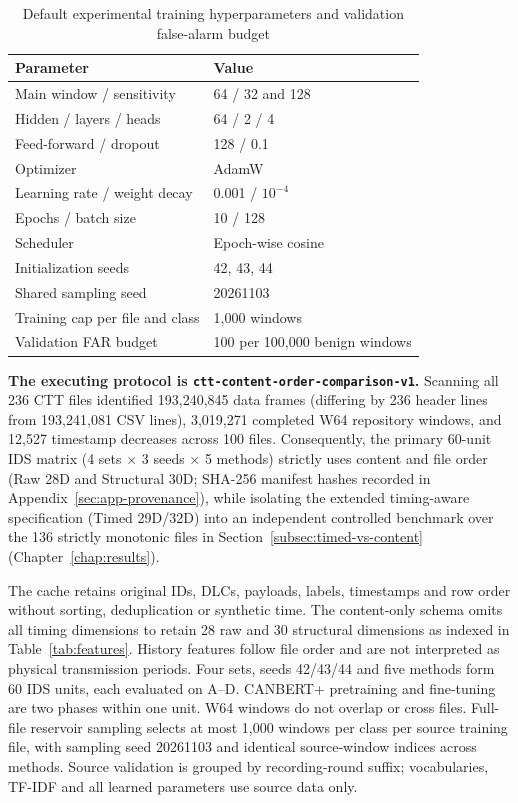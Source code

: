 \documentclass[12pt, a4paper, reqno, oneside]{book}
\DeclareRobustCommand{\code}[1]{\nolinkurl{#1}}
\begin{document}
{\renewcommand{\arraystretch}{0.88}
\begin{table}[htbp]\centering\footnotesize
\caption{Default experimental training hyperparameters and validation false-alarm budget}\label{tab:config}
\begin{tabular}{ll}\toprule Parameter & Value\\\midrule
Main window / sensitivity & 64 / 32 and 128\\
Hidden / layers / heads & 64 / 2 / 4\\
Feed-forward / dropout & 128 / 0.1\\
Optimizer & AdamW\\
Learning rate / weight decay & 0.001 / $10^{-4}$\\
Epochs / batch size & 10 / 128\\
Scheduler & Epoch-wise cosine\\
Initialization seeds & 42, 43, 44\\
Shared sampling seed & 20261103\\
Training cap per file and class & 1,000 windows\\
Validation FAR budget & 100 per 100,000 benign windows\\\bottomrule\end{tabular}
\end{table}}

\textbf{The executing protocol is \code{ctt-content-order-comparison-v1}.}
Scanning all 236 CTT files identified 193,240,845 data frames (differing by 236 header lines from 193,241,081 CSV lines), 3,019,271 completed W64 repository windows, and 12,527 timestamp decreases across 100 files. Consequently, the primary 60-unit IDS matrix (4 sets $\times$ 3 seeds $\times$ 5 methods) strictly uses content and file order (Raw 28D and Structural 30D; SHA-256 manifest hashes recorded in Appendix~\ref{sec:app-provenance}), while isolating the extended timing-aware specification (Timed 29D/32D) into an independent controlled benchmark over the 136 strictly monotonic files in Section~\ref{subsec:timed-vs-content} (Chapter~\ref{chap:results}).

The cache retains original IDs, DLCs, payloads, labels, timestamps and row order without sorting, deduplication or synthetic time. The content-only schema omits all timing dimensions to retain 28 raw and 30 structural dimensions as indexed in Table~\ref{tab:features}. History features follow file order and are not interpreted as physical transmission periods. Four sets, seeds 42/43/44 and five methods form 60 IDS units, each evaluated on A--D. CANBERT+ pretraining and fine-tuning are two phases within one unit. W64 windows do not overlap or cross files. Full-file reservoir sampling selects at most 1,000 windows per class per source training file, with sampling seed 20261103 and identical source-window indices across methods. Source validation is grouped by recording-round suffix; vocabularies, TF-IDF and all learned parameters use source data only.
\end{document}
